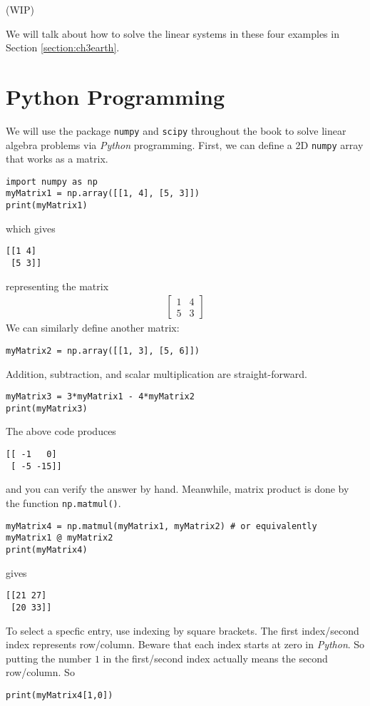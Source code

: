 (WIP)

We will talk about how to solve the linear systems in these four examples in Section \ref{section:ch3earth}.

\section{Python Programming}
We will use the package \texttt{numpy} and \texttt{scipy} throughout the book to solve linear algebra problems via \textit{Python} programming. First, we can define a 2D \texttt{numpy} array that works as a matrix.
\begin{lstlisting}
import numpy as np
myMatrix1 = np.array([[1, 4], [5, 3]])
print(myMatrix1)
\end{lstlisting}
which gives
\begin{lstlisting}
[[1 4]
 [5 3]]
\end{lstlisting}
representing the matrix
\begin{align*}
\begin{bmatrix}
1 & 4 \\
5 & 3
\end{bmatrix}
\end{align*}
We can similarly define another matrix:
\begin{lstlisting}
myMatrix2 = np.array([[1, 3], [5, 6]])    
\end{lstlisting}
Addition, subtraction, and scalar multiplication are straight-forward.
\begin{lstlisting}
myMatrix3 = 3*myMatrix1 - 4*myMatrix2
print(myMatrix3)
\end{lstlisting}
The above code produces
\begin{lstlisting}
[[ -1   0]
 [ -5 -15]]
\end{lstlisting}
and you can verify the answer by hand. Meanwhile, matrix product is done by the function \texttt{np.matmul()}.
\begin{lstlisting}
myMatrix4 = np.matmul(myMatrix1, myMatrix2) # or equivalently myMatrix1 @ myMatrix2
print(myMatrix4)
\end{lstlisting}
gives
\begin{lstlisting}
[[21 27]
 [20 33]]
\end{lstlisting}
To select a specfic entry, use indexing by square brackets. The first index/second index represents row/column. Beware that each index starts at zero in \textit{Python}. So putting the number $1$ in the first/second index actually means the second row/column. So
\begin{lstlisting}
print(myMatrix4[1,0])
\end{lstlisting}
